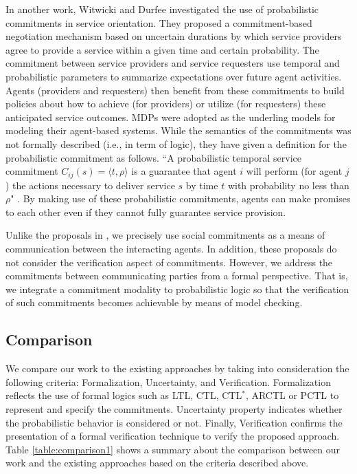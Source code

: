 In another work, Witwicki and Durfee \cite{Witwicki2009}
investigated the use of probabilistic commitments in service
orientation. They proposed a commitment-based negotiation
mechanism based on uncertain durations by which service providers
agree to provide a service within a given time and certain
probability. The commitment between service providers and service
requesters use temporal and probabilistic parameters to summarize
expectations over future agent activities. Agents (providers and
requesters) then benefit from these commitments to build policies
about how to achieve (for providers) or utilize (for requesters)
these anticipated service outcomes. MDPs were adopted as the
underling models for modeling their agent-based systems. While the
semantics of the commitments was not formally described (i.e., in
term of logic), they have given a definition for the probabilistic
commitment as follows. ``A probabilistic temporal service
commitment $C_{ij}(s) = \langle t, \rho\rangle$ is a guarantee
that agent $i$ will perform (for agent $j$) the actions necessary
to deliver service $s$ by time $t$ with probability no less than
$\rho$" \cite{Witwicki2009}. By making use of these  probabilistic
commitments, agents can make promises to each other even if they
cannot fully guarantee service provision.


Unlike the proposals in \cite{Witwicki2007,Witwicki2009}, we
precisely use social commitments as a means of communication between
the interacting agents. In addition, these proposals
do not consider the verification aspect of commitments. However, we address the commitments between communicating parties from a formal perspective. That is, we integrate a commitment modality to probabilistic logic so that the verification of such commitments becomes achievable by means of model checking.


\subsection{Comparison}

We compare our work to the existing approaches by taking into
consideration the following criteria: Formalization, Uncertainty,
and Verification. Formalization reflects the use of formal logics
such as LTL, CTL, CTL$^*$, ARCTL or PCTL to represent and specify
the commitments. Uncertainty property indicates whether the
probabilistic behavior is considered or not. Finally, Verification
confirms the presentation of a formal verification technique to
verify the proposed approach. Table \ref{table:comparison1} shows
a summary about the comparison between our work and the existing
approaches based on the criteria described above.

